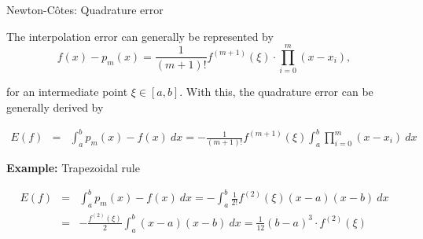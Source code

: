 \documentclass[11pt,compress,t,notes=noshow, xcolor=table]{beamer}
\begin{document}
\begin{vbframe}{Newton-C\^{o}tes: Quadrature error}

The interpolation error can generally be represented by
\vspace*{-0.3cm}
$$
f(x) - p_m(x) = \frac{1}{(m + 1)!} f^{(m + 1)}(\xi) \cdot \prod_{i = 0}^m (x - x_i),
$$

for an intermediate point $\xi \in [a, b]$. With this, the quadrature error can be generally derived by

\vspace*{-0.3cm}
\begin{eqnarray*}
E(f) &=& \int_a^b p_m(x) - f(x) ~dx = - \frac{1}{(m + 1)!} f^{(m + 1)}(\xi) \int_a^b \prod_{i = 0}^m (x - x_i) ~ dx
\end{eqnarray*}

\vspace*{0.3cm}
\textbf{Example:} Trapezoidal rule


\vspace*{-0.3cm}
\begin{eqnarray*}
E(f) &=& \int_a^b p_m(x) - f(x) ~dx = - \int_a^b \frac{1}{2!} f^{(2)}(\xi) (x - a)(x - b) ~dx\\
&=& - \frac{f^{(2)}(\xi)}{2} \int_a^b (x - a)(x - b)~dx = \frac{1}{12} (b - a)^3 \cdot f^{(2)}(\xi)
\end{eqnarray*}

\end{vbframe}
\end{document}
